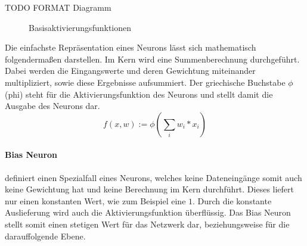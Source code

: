 TODO FORMAT Diagramm
\begin{figure}
\begin{minipage}{0.5\linewidth}
\end{minipage}
\begin{minipage}{0.5\linewidth}
\end{minipage}
	\caption{Basisaktivierungsfunktionen}
	\label{fig:Aktivierungsfunktion}
\end{figure}

\noindent 
Die einfachste Repräsentation eines Neurons lässt sich mathematisch folgendermaßen darstellen.
Im Kern wird eine Summenberechnung durchgeführt. 
Dabei werden die Eingangswerte und deren Gewichtung miteinander multipliziert, sowie diese Ergebnisse aufsummiert.
Der griechische Buchstabe $\phi$ (phi) steht für die Aktivierungsfunktion des Neurons und stellt damit die Ausgabe des Neurons dar.
\begin{equation}
	f(x, w) := \phi ( \sum\limits_{i}{w_i * x_i})
	\label{eq:Aktivierungsfunktion}
\end{equation}


\paragraph{Bias Neuron} 
\label{sec:Bias Neuron}

definiert einen Spezialfall eines Neurons, welches keine Dateneingänge somit auch keine Gewichtung hat und keine Berechnung im Kern durchführt. 
Dieses liefert nur einen konstanten Wert, wie zum Beispiel eine $1$. 
Durch die konstante Auslieferung wird auch die Aktivierungsfunktion überflüssig. 
Das Bias Neuron stellt somit einen stetigen Wert für das Netzwerk dar, beziehungsweise für die darauffolgende Ebene.

